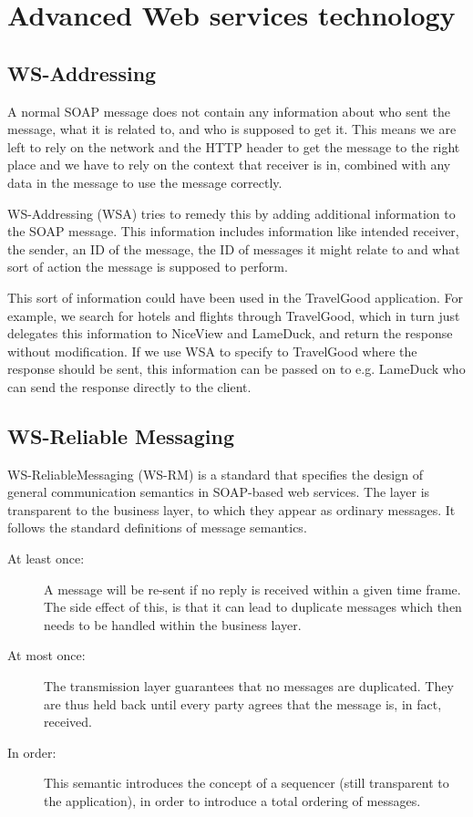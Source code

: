 \chapter{Advanced Web services technology}

\section{WS-Addressing}
A normal SOAP message does not contain any information about who sent the message, what it is related to, and who is supposed to get it. This means we are left to rely on the network and the HTTP header to get the message to the right place and we have to rely on the context that receiver is in, combined with any data in the message to use the message correctly.

WS-Addressing (WSA) tries to remedy this by adding additional information to the SOAP message. This information includes information like intended receiver, the sender, an ID of the message, the ID of messages it might relate to and what sort of action the message is supposed to perform.

This sort of information could have been used in the TravelGood application. For example, we search for hotels and flights through TravelGood, which in turn just delegates this information to NiceView and LameDuck, and return the response without modification. If we use WSA to specify to TravelGood where the response should be sent, this information can be passed on to e.g. LameDuck who can send the response directly to the client.

\section{WS-Reliable Messaging}
WS-ReliableMessaging (WS-RM) is a standard  that specifies the design of general communication semantics in SOAP-based web services. The layer is transparent to the business layer, to which they appear as ordinary messages.
It follows the standard definitions of message semantics.

\begin{description}
\item[At least once:] A message will be re-sent if no reply is received within a given time frame. The side effect of this, is that it can lead to duplicate messages which then needs to be handled within the business layer.
\item[At most once:] The transmission layer guarantees that no messages are duplicated. They are thus held back until every party agrees that the message is, in fact, received.
\item[In order:] This semantic introduces the concept of a sequencer (still transparent to the application), in order to introduce a total ordering of messages.
\end{description}

